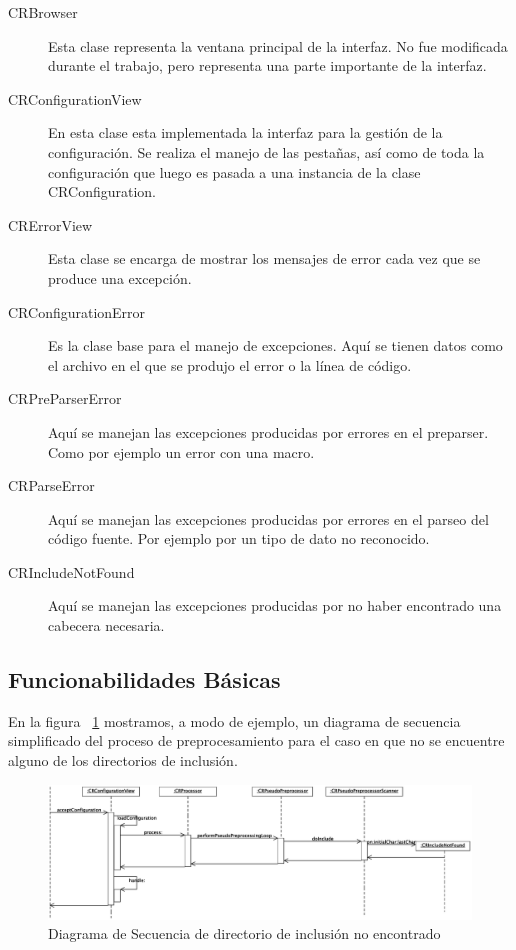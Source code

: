 \documentclass[a4paper,oneside,12pt]{article}
\begin{document}
\begin{description}
\item[CRBrowser] Esta clase representa la ventana principal de la interfaz. No fue modificada durante el trabajo, pero representa una parte importante de la interfaz.

\item[CRConfigurationView] En esta clase esta implementada la interfaz para la gesti\'on de la configuraci\'on. Se realiza el manejo de las pestañas, as\'i como de toda la configuraci\'on que luego es pasada a una instancia de la clase CRConfiguration.

\item[CRErrorView] Esta clase se encarga de mostrar los mensajes de error cada vez que se produce una excepci\'on.

\item[CRConfigurationError] Es la clase base para el manejo de excepciones. Aqu\'i se tienen datos como el archivo en el que se produjo el error o la l\'inea de c\'odigo.

\item[CRPreParserError] Aqu\'i se manejan las excepciones producidas por errores en el preparser. Como por ejemplo un error con una macro.

\item[CRParseError] Aqu\'i se manejan las excepciones producidas por errores en el parseo del c\'odigo fuente. Por ejemplo por un tipo de dato no reconocido.

\item[CRIncludeNotFound] Aqu\'i se manejan las excepciones producidas por no haber encontrado una cabecera necesaria.

\end{description}

\subsection{Funcionabilidades B\'asicas}

En la figura ~\ref{diagrama_de_secuencia_include_not_found} mostramos, a modo de ejemplo, un diagrama de secuencia simplificado del proceso de preprocesamiento para el caso en que no se encuentre alguno de los directorios de inclusión.

\begin{figure}[htbp]
  \centering
  \includegraphics[scale=0.40, angle=270]{images/secuencia_include_not_found.eps}
  \caption{Diagrama de Secuencia de directorio de inclusión no encontrado}
  \label{diagrama_de_secuencia_include_not_found}
\end{figure}
\end{document}
